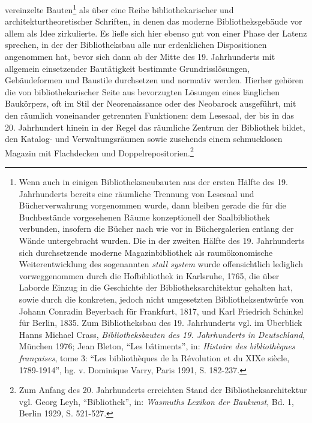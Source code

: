 vereinzelte Bauten\footnote{Wenn auch in einigen Bibliotheksneubauten
  aus der ersten Hälfte des 19. Jahrhunderts bereits eine räumliche
  Trennung von Lesesaal und Bücherverwahrung vorgenommen wurde, dann
  bleiben gerade die für die Buchbestände vorgesehenen Räume
  konzeptionell der Saalbibliothek verbunden, insofern die Bücher nach
  wie vor in Büchergalerien entlang der Wände untergebracht wurden. Die
  in der zweiten Hälfte des 19. Jahrhunderts sich durchsetzende moderne
  Magazinbibliothek als raumökonomische Weiterentwicklung des
  sogenannten \emph{stall system} wurde offensichtlich lediglich
  vorweggenommen durch die Hofbibliothek in Karlsruhe, 1765, die über
  Laborde Einzug in die Geschichte der Bibliotheksarchitektur gehalten
  hat, sowie durch die konkreten, jedoch nicht umgesetzten
  Bibliotheksentwürfe von Johann Conradin Beyerbach für Frankfurt, 1817,
  und Karl Friedrich Schinkel für Berlin, 1835. Zum Bibliotheksbau des
  19. Jahrhunderts vgl. im Überblick Hanns Michael Crass,
  \emph{Bibliotheksbauten des 19. Jahrhunderts in Deutschland}, München
  1976; Jean Bleton, \enquote{Les bâtiments}, in: \emph{Histoire des
  bibliothèques françaises}, tome 3: \enquote{Les bibliothèques de la
  Révolution et du XIXe siècle, 1789-1914}, hg. v. Dominique Varry,
  Paris 1991, S. 182-237.} als über eine Reihe bibliothekarischer und
architekturtheoretischer Schriften, in denen das moderne
Bibliotheksgebäude vor allem als Idee zirkulierte. Es ließe sich hier
ebenso gut von einer Phase der Latenz sprechen, in der der
Bibliotheksbau alle nur erdenklichen Dispositionen angenommen hat, bevor
sich dann ab der Mitte des 19. Jahrhunderts mit allgemein einsetzender
Bautätigkeit bestimmte Grundrisslösungen, Gebäudeformen und Baustile
durchsetzen und normativ werden. Hierher gehören die von
bibliothekarischer Seite aus bevorzugten Lösungen eines länglichen
Baukörpers, oft im Stil der Neorenaissance oder des Neobarock
ausgeführt, mit den räumlich voneinander getrennten Funktionen: dem
Lesesaal, der bis in das 20. Jahrhundert hinein in der Regel das
räumliche Zentrum der Bibliothek bildet, den Katalog- und
Verwaltungsräumen sowie zusehends einem schmucklosen Magazin mit
Flachdecken und Doppelrepositorien.\footnote{Zum Anfang des 20.
  Jahrhunderts erreichten Stand der Bibliotheksarchitektur vgl. Georg
  Leyh, \enquote{Bibliothek}, in: \emph{Wasmuths Lexikon der Baukunst},
  Bd. 1, Berlin 1929, S. 521-527.}

